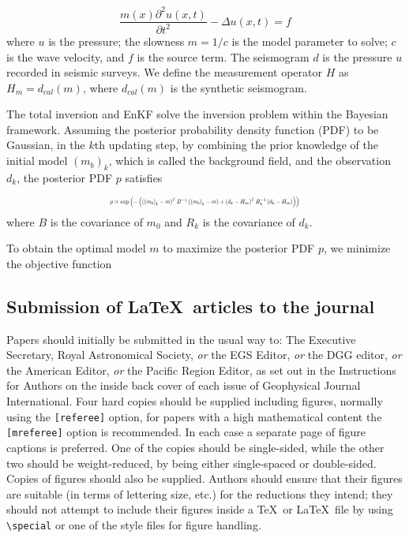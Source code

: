 \documentclass{gji}
\begin{document}
\begin{equation}
\frac{m(x)\partial ^2{u}(x,t)}{\partial{t^2}}-\Delta u(x,t)=f
\end{equation}
where $u$ is the pressure; the slowness $m=1/c$ is the model parameter to solve; $c$ is the wave velocity, and $f$ is the source term. The seismogram $d$ is the pressure $u$ recorded in seismic surveys. We define the measurement operator $H$ as $H_m=d_{cal}(m)$, where $d_{cal}(m)$ is the synthetic seismogram.

The total inversion and EnKF solve the inversion problem within the Bayesian framework. Assuming the posterior probability density function (PDF) to be Gaussian, in the $k$th updating step, by combining the prior knowledge of the initial model $(m_b)_k$, which is called the background field, and the observation $d_k$, the posterior PDF $p$ satisfies


\begin{equation}
\resizebox{0.5\textwidth}{!}{$p \varpropto \exp\left ( -\left ( \left ( \left ( m_b \right )_k - m \right )^T B^{-1} \left ( \left ( m_b \right )_k -m\right ) +\left ( d_k-H_m \right )^TR_k^{-1}\left ( d_k-H_m \right )\right ) \right )$}
\end{equation}
where $B$ is the covariance of $m_0$ and $R_k$ is the covariance of $d_k$. 

To obtain the optimal model $m$ to maximize the posterior PDF $p$, we minimize the objective function


\subsection{Submission of \LaTeX\ articles to the journal}

Papers should initially be submitted in the usual way to:
The Executive Secretary, Royal Astronomical Society, {\em or\/}
the EGS Editor,  {\em or\/} the DGG editor,  {\em or\/}
the American Editor,  {\em or\/} the Pacific Region Editor,
as set out in the Instructions for Authors on the inside back cover of
each issue of Geophysical Journal International.
Four hard copies should be supplied including figures, normally using the
\verb"[referee]" option, for papers with a  high mathematical content the
\verb"[mreferee]" option is recommended. In each case a separate page of
figure captions is preferred.
One of the copies should  be single-sided,
while the other two should  be weight-reduced, by being either
single-spaced or double-sided.   Copies of figures should
also be supplied. Authors should  ensure that their figures are suitable
(in terms of lettering size, etc.)  for the reductions they intend; they
should not attempt to include their figures inside a \TeX\ or \LaTeX\
file by using \verb"\special" or one of the style files for figure
handling.
\end{document}
